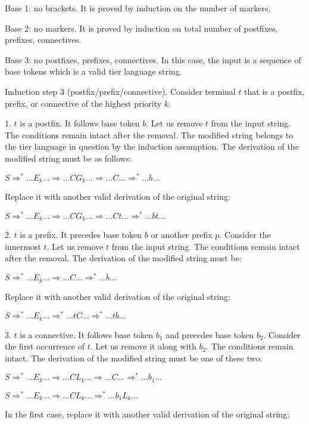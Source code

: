 \documentclass{llncs}
\begin{document}
Base 1: no brackets. It is proved by induction on the number of markers.

Base 2: no markers. It is proved by induction on total number of postfixes, prefixes, connectives.

Base 3: no postfixes, prefixes, connectives. In this case, the input is a sequence of base tokens which is a valid tier language string.

Induction step 3 (postfix/prefix/connective). Consider terminal $t$ that is a postfix, prefix, or connective of the highest priority $k$.

1. $t$ is a postfix. It follows base token $b$. Let us remove $t$ from the input string. The conditions remain intact after the removal. The modified string belongs to the tier language in question by the induction assumption. The derivation of the modified string must be as follows:

\noindent
$S \Rightarrow^* ... E_k ... \Rightarrow ... C G_k ... \Rightarrow ... C ... \Rightarrow^* ... b ...$

Replace it with another valid derivation of the original string:

\noindent
$S \Rightarrow^* ... E_k ... \Rightarrow ... C G_k ... \Rightarrow ... C t ... \Rightarrow^* ... b t ...$ 

2. $t$ is a prefix. It precedes base token $b$ or another prefix $p$. Consider the innermost $t$. Let us remove $t$ from the input string. The conditions remain intact after the removal. The derivation of the modified string must be:

\noindent
$S \Rightarrow^* ... E_k ... \Rightarrow ... C ... \Rightarrow^* ... b ...$

Replace it with another valid derivation of the original string:

\noindent
$S \Rightarrow^* ... E_k ... \Rightarrow^* ... t C ... \Rightarrow^* ... t b ...$

3. $t$ is a connective. It follows base token $b_1$ and precedes base token $b_2$. Consider the first occurrence of $t$. Let us remove it along with $b_2$. The conditions remain intact. The derivation of the modified string must be one of these two:

\noindent
$S \Rightarrow^* ... E_k ... \Rightarrow ... C L_k ... \Rightarrow ... C ... \Rightarrow^* ... b_1 ...$

\noindent
$S \Rightarrow^* ... E_k ... \Rightarrow ... C L_k ... \Rightarrow^* ... b_1 L_k ...$

In the first case, replace it with another valid derivation of the original string:
\end{document}

